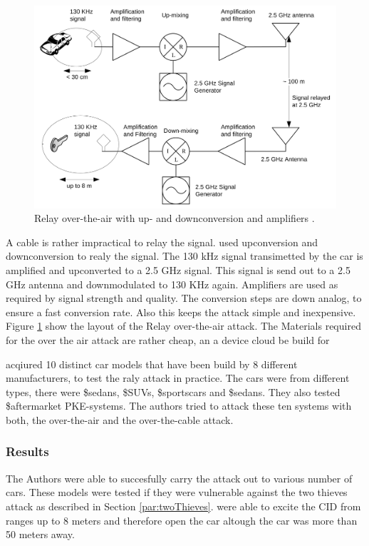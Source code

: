 	\begin{figure}[htb]
		\begin{center}
			\includegraphics[width=\textwidth]{pictures/franc_relay_over_the_air.png}
		\end{center}
		\caption{Relay over-the-air with up- and downconversion and amplifiers \citep[p. 6]{relayAttacksFranc}.}
		\label{fig:relayOTA}
	\end{figure}
	A cable is rather impractical to relay the signal.
	\citeauthor{relayAttacksFranc} used upconversion and downconversion to realy the signal.
	The 130 kHz signal transimetted by the car is amplified and upconverted to a 2.5 GHz signal.
	This signal is send out to a 2.5 GHz antenna and downmodulated to 130 KHz again.
	Amplifiers are used as required by signal strength and quality.
	The conversion steps are down analog,
	to ensure a fast conversion rate.
	Also this keeps the attack simple and inexpensive.
	Figure \ref{fig:relayOTA} show the layout of the Relay over-the-air attack.
	The Materials required for the over the air attack are rather cheap,
	an a device cloud be build for 

	\citeauthor{relayAttacksFranc} acqiured 10 distinct car models that have been build by 8 different manufacturers,
	to test the raly attack in practice.
	The cars were from different types,
	there were \$sedans, \$SUVs, \$sportscars  and \$sedans.
	They also tested \$aftermarket PKE-systems.
	The authors tried to attack these ten systems with both,
	the over-the-air and the over-the-cable attack.

\subsubsection*{Results}
	The Authors were able to succesfully carry the attack out to various number of cars.
	These models were tested if they were vulnerable against the two thieves attack as described in 
	Section \ref{par:twoThieves}.
	\citeauthor{relayAttacksFranc} were able to excite the CID from ranges up to 8 meters
	and therefore open the car altough the car was more than 50 meters away.

